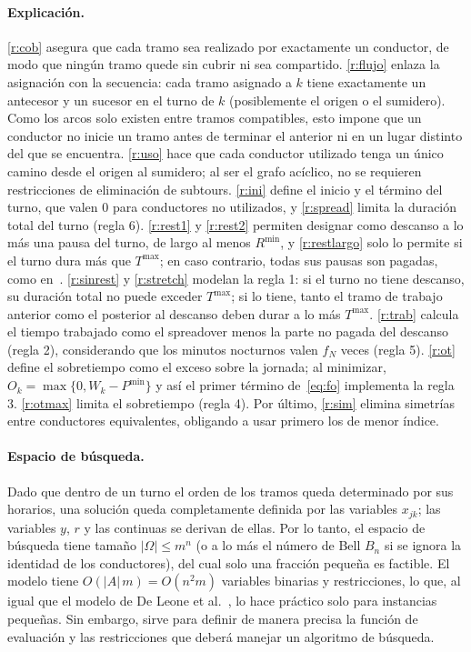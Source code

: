 \documentclass[letter, 10pt]{article}
\begin{document}
\paragraph{Explicación.}
\eqref{r:cob} asegura que cada tramo sea realizado por exactamente un conductor, de modo que ningún tramo quede sin cubrir ni sea compartido. \eqref{r:flujo} enlaza la asignación con la secuencia: cada tramo asignado a $k$ tiene exactamente un antecesor y un sucesor en el turno de $k$ (posiblemente el origen o el sumidero). Como los arcos solo existen entre tramos compatibles, esto impone que un conductor no inicie un tramo antes de terminar el anterior ni en un lugar distinto del que se encuentra. \eqref{r:uso} hace que cada conductor utilizado tenga un único camino desde el origen al sumidero; al ser el grafo acíclico, no se requieren restricciones de eliminación de subtours. \eqref{r:ini} define el inicio y el término del turno, que valen 0 para conductores no utilizados, y \eqref{r:spread} limita la duración total del turno (regla 6). \eqref{r:rest1} y \eqref{r:rest2} permiten designar como descanso a lo más una pausa del turno, de largo al menos $R^{\min}$, y \eqref{r:restlargo} solo lo permite si el turno dura más que $T^{\max}$; en caso contrario, todas sus pausas son pagadas, como en~\cite{Constantino2017}. \eqref{r:sinrest} y \eqref{r:stretch} modelan la regla 1: si el turno no tiene descanso, su duración total no puede exceder $T^{\max}$; si lo tiene, tanto el tramo de trabajo anterior como el posterior al descanso deben durar a lo más $T^{\max}$. \eqref{r:trab} calcula el tiempo trabajado como el spreadover menos la parte no pagada del descanso (regla 2), considerando que los minutos nocturnos valen $f_N$ veces (regla 5). \eqref{r:ot} define el sobretiempo como el exceso sobre la jornada; al minimizar, $O_k=\max\{0,W_k-P^{\min}\}$ y así el primer término de~\eqref{eq:fo} implementa la regla 3. \eqref{r:otmax} limita el sobretiempo (regla 4). Por último, \eqref{r:sim} elimina simetrías entre conductores equivalentes, obligando a usar primero los de menor índice.

\paragraph{Espacio de búsqueda.}
Dado que dentro de un turno el orden de los tramos queda determinado por sus horarios, una solución queda completamente definida por las variables $x_{jk}$; las variables $y$, $r$ y las continuas se derivan de ellas. Por lo tanto, el espacio de búsqueda tiene tamaño $|\Omega|\leq m^{n}$ (o a lo más el número de Bell $B_n$ si se ignora la identidad de los conductores), del cual solo una fracción pequeña es factible. El modelo tiene $O(|A|\,m)=O(n^2m)$ variables binarias y restricciones, lo que, al igual que el modelo de De Leone et al.~\cite{DeLeone2011a}, lo hace práctico solo para instancias pequeñas. Sin embargo, sirve para definir de manera precisa la función de evaluación y las restricciones que deberá manejar un algoritmo de búsqueda.
\end{document}
